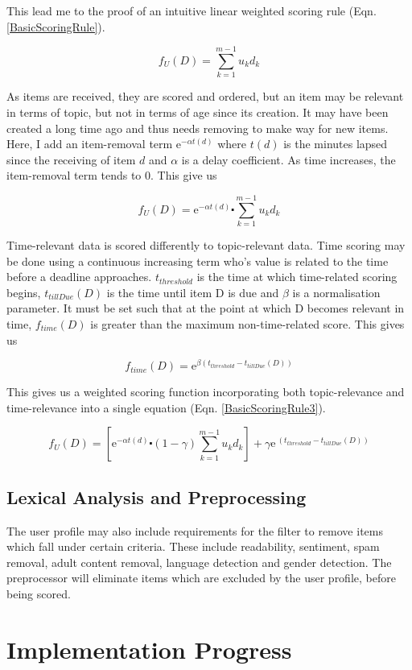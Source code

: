 This lead me to the proof of an intuitive linear weighted scoring rule (Eqn. \ref{BasicScoringRule}).

\begin{equation}\label{BasicScoringRule}
f_U (D) = \sum_{k=1}^{m-1} u_kd_k
\end{equation}

As items are received, they are scored and ordered, but an item may be relevant in terms of topic, but not in terms of age since its creation. It may have been created a long time ago and thus needs removing to make way for new items. Here, I add an item-removal term ${\mathrm{e}}^{-\alpha t(d)}$ where $t(d)$ is the minutes lapsed since the receiving of item $d$ and $\alpha$ is a delay coefficient. As time increases, the item-removal term tends to 0. This give us

\begin{equation}\label{BasicScoringRule2}
	f_U (D) = {\mathrm{e}}^{-\alpha t(d)} \centerdot \sum_{k=1}^{m-1} u_kd_k
\end{equation}

Time-relevant data is scored differently to topic-relevant data. Time scoring may be done using a continuous increasing term who's value is related to the time before a deadline approaches. $t_{threshold}$ is the time at which time-related scoring begins, $t_{tillDue}(D)$ is the time until item D is due and $\beta$ is a normalisation parameter. It must be set such that at the point at which D becomes relevant in time, $f_{time}(D)$ is greater than the maximum non-time-related score. This gives us

\begin{equation}\label{BasicTimeScoringRule}
	f_{time} (D) = {\mathrm{e}}^{\beta (t_{threshold}-t_{tillDue}(D))}
\end{equation}

This gives us a weighted scoring function incorporating both topic-relevance and time-relevance into a single equation (Eqn. \ref{BasicScoringRule3}).

\begin{equation}\label{BasicScoringRule3}
	f_U (D) = \left[{\mathrm{e}}^{-\alpha t(d)} \centerdot (1-\gamma) \sum_{k=1}^{m-1} u_kd_k \right] + \gamma{\mathrm{e}}^{\ (t_{threshold}-t_{tillDue}(D))}
\end{equation}

\subsection{Lexical Analysis and Preprocessing}

The user profile may also include requirements for the filter to remove items which fall under certain criteria. These include readability, sentiment, spam removal, adult content removal, language detection and gender detection. The preprocessor will eliminate items which are excluded by the user profile, before being scored. 

\section{Implementation Progress}

